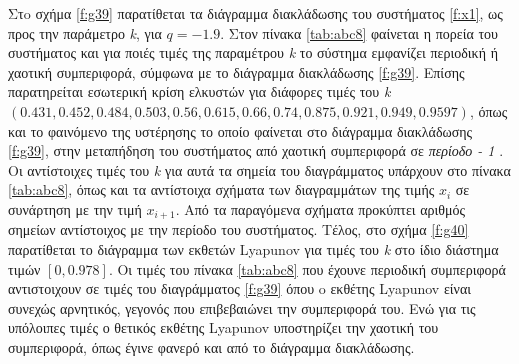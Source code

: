 Στo σχήμα \ref{f:g39} παρατίθεται τα διάγραμμα διακλάδωσης του συστήματος \ref{f:x1}, ως προς την παράμετρο \emph{k}, για $q =- 1.9$. 
Στον πίνακα \ref{tab:abc8} φαίνεται η πορεία του συστήματος και για ποιές τιμές της παραμέτρου \emph{k} το σύστημα εμφανίζει περιοδική ή χαοτική συμπεριφορά, σύμφωνα με το διάγραμμα διακλάδωσης \ref{f:g39}.
Επίσης παρατηρείται εσωτερική κρίση ελκυστών για διάφορες τιμές του \emph{k} $(0.431, 0.452, 0.484, 0.503, 0.56, 0.615, 0.66, 0.74, 0.875, 0.921, 0.949, 0.9597)$, όπως και το φαινόμενο της υστέρησης το οποίο φαίνεται στο διάγραμμα διακλάδωσης \ref{f:g39}, στην μεταπήδηση του συστήματος από χαοτική συμπεριφορά σε \emph{περίοδο - 1} . Οι αντίστοιχες τιμές του \emph{k} για αυτά τα σημεία του διαγράμματος υπάρχουν στο πίνακα \ref{tab:abc8}, όπως και τα αντίστοιχα σχήματα των διαγραμμάτων της τιμής \(x_i\) σε συνάρτηση με την τιμή \(x_{i+1}\). Από τα παραγόμενα σχήματα προκύπτει αριθμός σημείων αντίστοιχος με την περίοδο του συστήματος.
Τέλος, στο σχήμα \ref{f:g40} παρατίθεται το διάγραμμα των εκθετών Lyapunov για τιμές του \emph{k} στο ίδιο διάστημα τιμών $[0, 0.978]$. Οι τιμές του πίνακα \ref{tab:abc8} που έχουνε περιοδική συμπεριφορά αντιστοιχουν σε τιμές του διαγράμματος \ref{f:g39} όπου o εκθέτης Lyapunov είναι συνεχώς αρνητικός, γεγονός που επιβεβαιώνει την συμπεριφορά του. Ενώ για τις υπόλοιπες τιμές ο θετικός εκθέτης Lyapunov υποστηρίζει την χαοτική του συμπεριφορά, όπως έγινε φανερό και από το διάγραμμα διακλάδωσης.



